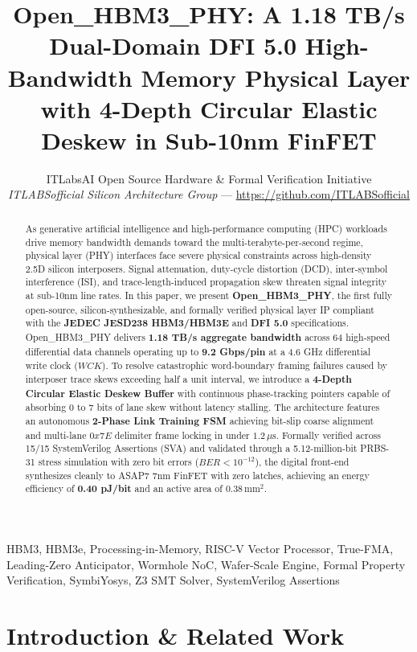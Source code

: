 \documentclass[journal,10pt,twocolumn]{IEEEtran}
\title{Open\_HBM3\_PHY: A 1.18 TB/s Dual-Domain DFI 5.0 High-Bandwidth Memory Physical Layer with 4-Depth Circular Elastic Deskew in Sub-10nm FinFET}
\author{ITLabsAI Open Source Hardware \& Formal Verification Initiative\\
\textit{ITLABSofficial Silicon Architecture Group} --- \url{https://github.com/ITLABSofficial}}
\begin{document}
\maketitle
\begin{abstract}
As generative artificial intelligence and high-performance computing (HPC) workloads drive memory bandwidth demands toward the multi-terabyte-per-second regime, physical layer (PHY) interfaces face severe physical constraints across high-density 2.5D silicon interposers. Signal attenuation, duty-cycle distortion (DCD), inter-symbol interference (ISI), and trace-length-induced propagation skew threaten signal integrity at sub-10nm line rates. In this paper, we present \textbf{Open\_HBM3\_PHY}, the first fully open-source, silicon-synthesizable, and formally verified physical layer IP compliant with the \textbf{JEDEC JESD238 HBM3/HBM3E} and \textbf{DFI 5.0} specifications. Open\_HBM3\_PHY delivers \textbf{1.18 TB/s aggregate bandwidth} across 64 high-speed differential data channels operating up to \textbf{9.2 Gbps/pin} at a 4.6 GHz differential write clock ($WCK$). To resolve catastrophic word-boundary framing failures caused by interposer trace skews exceeding half a unit interval, we introduce a \textbf{4-Depth Circular Elastic Deskew Buffer} with continuous phase-tracking pointers capable of absorbing 0 to 7 bits of lane skew without latency stalling. The architecture features an autonomous \textbf{2-Phase Link Training FSM} achieving bit-slip coarse alignment and multi-lane $0x7E$ delimiter frame locking in under $1.2\,\mu\text{s}$. Formally verified across 15/15 SystemVerilog Assertions (SVA) and validated through a 5.12-million-bit PRBS-31 stress simulation with zero bit errors ($BER < 10^{-12}$), the digital front-end synthesizes cleanly to ASAP7 7nm FinFET with zero latches, achieving an energy efficiency of \textbf{0.40 pJ/bit} and an active area of \textbf{$0.38\,\text{mm}^2$}.
\end{abstract}
\begin{IEEEkeywords}
HBM3, HBM3e, Processing-in-Memory, RISC-V Vector Processor, True-FMA, Leading-Zero Anticipator, Wormhole NoC, Wafer-Scale Engine, Formal Property Verification, SymbiYosys, Z3 SMT Solver, SystemVerilog Assertions
\end{IEEEkeywords}


\section{Introduction \& Related Work}
\end{document}
